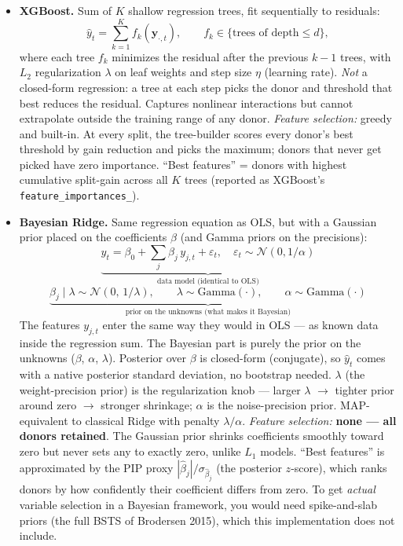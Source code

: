 \documentclass[11pt,a4paper]{article}
\begin{document}
\begin{itemize}
    \emph{Feature selection:} explicit via the $L_1$ term --- donors with weak partial correlation against Brent's residual get $\beta_j = 0$. Higher $\rho$ $\to$ sparser selection. ``Best features'' = donors whose marginal contribution survives the L1 threshold after accounting for collinearity with already-selected donors.
  \item \textbf{XGBoost.} Sum of $K$ shallow regression trees, fit sequentially to residuals:
    \[
      \hat{y}_t = \sum_{k=1}^{K} f_k(\mathbf{y}_{\cdot, t}), \qquad f_k \in \{\text{trees of depth} \leq d\},
    \]
    where each tree $f_k$ minimizes the residual after the previous $k-1$ trees, with $L_2$ regularization $\lambda$ on leaf weights and step size $\eta$ (learning rate). \emph{Not} a closed-form regression: a tree at each step picks the donor and threshold that best reduces the residual. Captures nonlinear interactions but cannot extrapolate outside the training range of any donor.
    \emph{Feature selection:} greedy and built-in. At every split, the tree-builder scores every donor's best threshold by gain reduction and picks the maximum; donors that never get picked have zero importance. ``Best features'' = donors with highest cumulative split-gain across all $K$ trees (reported as XGBoost's \texttt{feature\_importances\_}).
  \item \textbf{Bayesian Ridge.} Same regression equation as OLS, but with a Gaussian prior placed on the coefficients $\beta$ (and Gamma priors on the precisions):
    \[
      \underbrace{y_t = \beta_0 + \sum_j \beta_j\, y_{j,t} + \varepsilon_t, \quad \varepsilon_t \sim \mathcal{N}(0, 1/\alpha)}_{\text{data model (identical to OLS)}}
    \]
    \[
      \underbrace{\beta_j \mid \lambda \sim \mathcal{N}(0,\, 1/\lambda), \qquad \lambda \sim \text{Gamma}(\cdot), \qquad \alpha \sim \text{Gamma}(\cdot)}_{\text{prior on the unknowns (what makes it Bayesian)}}
    \]
    The features $y_{j,t}$ enter the same way they would in OLS --- as known data inside the regression sum. The Bayesian part is purely the prior on the unknowns ($\beta$, $\alpha$, $\lambda$). Posterior over $\beta$ is closed-form (conjugate), so $\hat{y}_t$ comes with a native posterior standard deviation, no bootstrap needed. $\lambda$ (the weight-precision prior) is the regularization knob --- larger $\lambda$ $\to$ tighter prior around zero $\to$ stronger shrinkage; $\alpha$ is the noise-precision prior. MAP-equivalent to classical Ridge with penalty $\lambda/\alpha$.
    \emph{Feature selection:} \textbf{none --- all donors retained}. The Gaussian prior shrinks coefficients smoothly toward zero but never sets any to exactly zero, unlike $L_1$ models. ``Best features'' is approximated by the PIP proxy $|\hat\beta_j| / \sigma_{\hat\beta_j}$ (the posterior $z$-score), which ranks donors by how confidently their coefficient differs from zero. To get \emph{actual} variable selection in a Bayesian framework, you would need spike-and-slab priors (the full BSTS of Brodersen 2015), which this implementation does not include.
\end{itemize}
\end{document}
